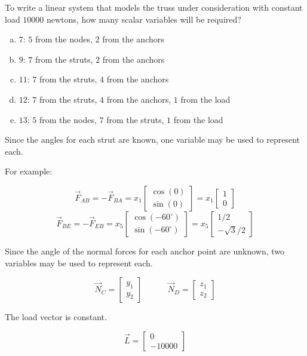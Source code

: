 \begin{activity}{5}
To write a linear system that models the truss under consideration
with constant load \(10000\) newtons,
how many scalar variables will be required?

\drawtruss{}

\begin{enumerate}[a)]
\item \(7\): \(5\) from the nodes, \(2\) from the anchors
\item \(9\): \(7\) from the struts, \(2\) from the anchors
\item \(11\): \(7\) from the struts, \(4\) from the anchors
\item \(12\): \(7\) from the struts, \(4\) from the anchors, \(1\) from the load
\item \(13\): \(5\) from the nodes, \(7\) from the struts, \(1\) from the load
\end{enumerate}
\end{activity}

\begin{observation}
Since the angles for each strut are known,
one variable may be used to represent each.

\drawtruss{\trussStrutVariables}

For example:

\[
\vec F_{AB}=-\vec F_{BA}=x_1\begin{bmatrix}\cos(0)\\\sin(0)\end{bmatrix}
=x_1\begin{bmatrix}1\\0\end{bmatrix}
\]
\[
\vec F_{BE}=-\vec F_{EB}=x_5\begin{bmatrix}\cos(-60^\circ)\\\sin(-60^\circ)\end{bmatrix}
=x_5\begin{bmatrix}1/2\\-\sqrt{3}/2\end{bmatrix}
\]


\end{observation}

\begin{observation}
Since the angle of the normal forces for each anchor point are unknown,
two variables may be used to represent each.

\drawtruss{\trussNormalForces}

\[
\vec N_C=\begin{bmatrix}y_1\\y_2\end{bmatrix}
\hspace{3em}
\vec N_D=\begin{bmatrix}z_1\\z_2\end{bmatrix}
\]

The load vector is constant.

\[
\vec L = \begin{bmatrix}0\\-10000\end{bmatrix}
\]

\end{observation}


